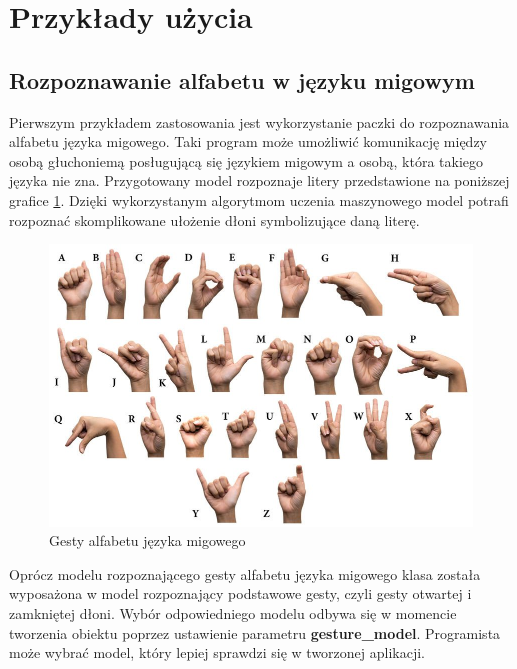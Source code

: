 \section{Przykłady użycia}
\subsection{Rozpoznawanie alfabetu w języku migowym}
\quad Pierwszym przykładem zastosowania jest wykorzystanie paczki do rozpoznawania alfabetu języka migowego. Taki program może umożliwić komunikację między osobą głuchoniemą posługującą się językiem migowym a osobą, która takiego języka nie zna. Przygotowany model rozpoznaje litery przedstawione na poniższej grafice \ref{img:alphabet}. Dzięki wykorzystanym algorytmom uczenia maszynowego model potrafi rozpoznać skomplikowane ułożenie dłoni symbolizujące daną literę.  


\begin{figure}[H]
    \begin{center}
        \includegraphics[width=15cm]{../images/american_sign_language.jpg}
        \caption{Gesty alfabetu języka migowego}
        \label{img:alphabet}
    \end{center}
\end{figure}

\quad Oprócz modelu rozpoznającego gesty alfabetu języka migowego klasa została wyposażona w model rozpoznający podstawowe gesty, czyli gesty otwartej i zamkniętej dłoni. Wybór odpowiedniego modelu odbywa się w momencie tworzenia obiektu poprzez ustawienie parametru \textbf{gesture\_model}. Programista może wybrać model, który lepiej sprawdzi się w tworzonej aplikacji. 


